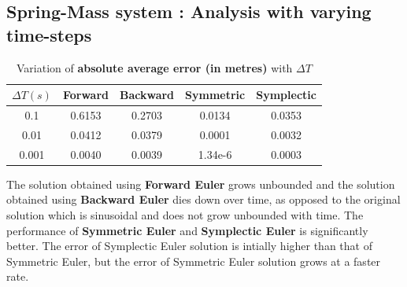 \documentclass[11pt]{article}
\begin{document}
\subsection*{Spring-Mass system : Analysis with varying time-steps}
\begin{table}[H]
    \begin{center}
        \caption*{Variation of \textbf{absolute average error (in metres)} with $\Delta T$}
        \begin{tabular}{|c|c|c|c|c|}
            \hline
             $\Delta T (s)$ &  Forward & Backward & Symmetric & Symplectic \\
            \hline
            0.1   &  0.6153 & 0.2703   &  0.0134 & 0.0353\\
            \hline
            0.01   &  0.0412 & 0.0379   &  0.0001 & 0.0032\\
            \hline   
            0.001   &  0.0040 & 0.0039   &  1.34e-6 & 0.0003\\
            \hline     		
        \end{tabular}
    \end{center}
 \end{table}
The solution obtained using \textbf{Forward Euler} grows unbounded and the solution obtained using \textbf{Backward Euler}
dies down over time, as opposed to the original solution which is sinusoidal and does not grow unbounded with time. The performance of 
\textbf{Symmetric Euler} and \textbf{Symplectic Euler} is significantly better. The error of Symplectic Euler solution is intially higher than that of Symmetric Euler, but the error of Symmetric Euler solution grows at a faster rate.
\end{document}
